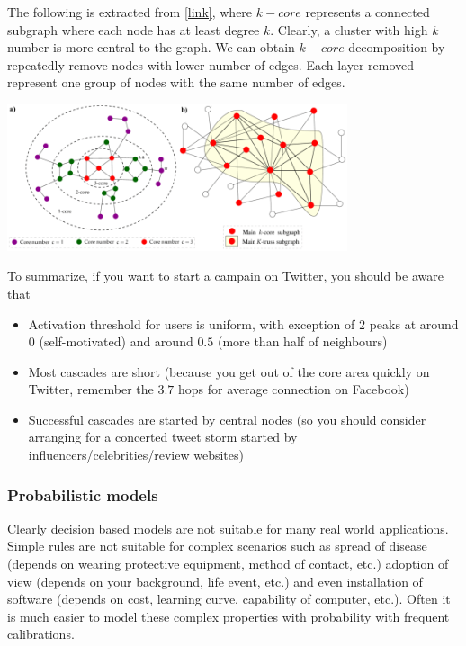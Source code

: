The following is extracted from \href{https://www.aclweb.org/anthology/D16-1191.pdf}{[link]}, where $k-core$ represents a connected subgraph where each node has at least degree $k$. Clearly, a cluster with high $k$ number is more central to the graph. We can obtain $k-core$ decomposition by repeatedly remove nodes with lower number of edges. Each layer removed represent one group of nodes with the same number of edges. 

{
\centering
\includegraphics[width=0.75\textwidth]{notes/img/n3_kcore.png} \par
}

To summarize, if you want to start a campain on Twitter, you should be aware that 

\begin{itemize}
    \item Activation threshold for users is uniform, with exception of $2$ peaks at around $0$ (self-motivated) and around $0.5$ (more than half of neighbours)
    
    \item Most cascades are short (because you get out of the core area quickly on Twitter, remember the $3.7$ hops for average connection on Facebook)
    
    \item Successful cascades are started by central nodes (so you should consider arranging for a concerted tweet storm started by influencers/celebrities/review websites)
\end{itemize}{}

\subsubsection{Probabilistic models}

Clearly decision based models are not suitable for many real world applications. Simple rules are not suitable for complex scenarios such as spread of disease (depends on wearing protective equipment, method of contact, etc.) adoption of view (depends on your background, life event, etc.) and even installation of software (depends on cost, learning curve, capability of computer, etc.). Often it is much easier to model these complex properties with probability with frequent calibrations. 


